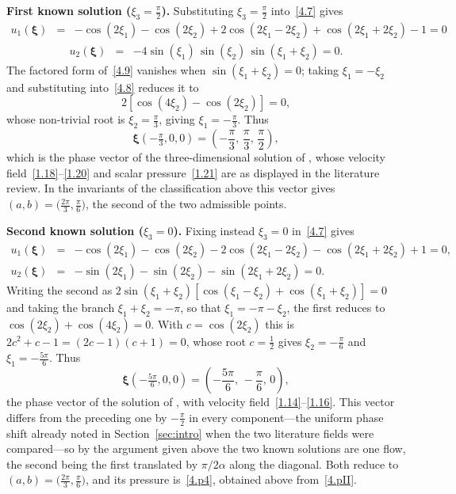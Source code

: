 \documentclass[11pt]{jfm}
\numberwithin{equation}{section}
\begin{document}
\medskip
\noindent\textbf{First known solution ($\xi_3=\tfrac{\pi}{2}$).} Substituting $\xi_3=\tfrac{\pi}{2}$
into~\eqref{4.7} gives
\begin{eqnarray}
\label{4.8}
u_1(\boldsymbol{\xi}) &=& -\cos(2\xi_1) - \cos(2\xi_2) + 2\cos(2\xi_1 - 2\xi_2) + \cos(2\xi_1 + 2\xi_2) - 1 = 0
\end{eqnarray}
\begin{eqnarray}
\label{4.9}
u_2(\boldsymbol{\xi}) &=& -4\sin(\xi_1)\,\sin(\xi_2)\,\sin(\xi_1 + \xi_2) = 0 .
\end{eqnarray}
The factored form of~\eqref{4.9} vanishes when $\sin(\xi_1+\xi_2)=0$; taking $\xi_1 = -\xi_2$
and substituting into~\eqref{4.8} reduces it to
\[
2\left[\cos(4\xi_2) - \cos(2\xi_2)\right] = 0 ,
\]
whose non-trivial root is $\xi_2 = \tfrac{\pi}{3}$, giving $\xi_1 = -\tfrac{\pi}{3}$. Thus
\[
\boldsymbol{\xi}\!\left(-\tfrac{\pi}{3},0,0\right)
=\left(-\frac{\pi}{3},\,\frac{\pi}{3},\,\frac{\pi}{2}\right),
\]
which is the phase vector of the three-dimensional solution of \cite{tha4}, whose velocity
field~\eqref{1.18}--\eqref{1.20} and scalar pressure~\eqref{1.21} are as displayed in the
literature review. In the invariants of the classification above this vector gives
$(a,b)=\bigl(\tfrac{2\pi}{3},\tfrac{\pi}{6}\bigr)$, the second of the two admissible points.

\medskip
\noindent\textbf{Second known solution ($\xi_3=0$).} Fixing instead $\xi_3 = 0$ in~\eqref{4.7} gives
\begin{eqnarray}
\label{4.10}
u_1(\boldsymbol{\xi}) &=& -\cos(2\xi_1) - \cos(2\xi_2) - 2\cos(2\xi_1 - 2\xi_2) - \cos(2\xi_1 + 2\xi_2) + 1 = 0, \nonumber\\
u_2(\boldsymbol{\xi}) &=& -\sin(2\xi_1) - \sin(2\xi_2) - \sin(2\xi_1 + 2\xi_2) = 0 .
\end{eqnarray}
Writing the second as $2\sin(\xi_1+\xi_2)\left[\cos(\xi_1-\xi_2)+\cos(\xi_1+\xi_2)\right]=0$
and taking the branch $\xi_1+\xi_2=-\pi$, so that $\xi_1 = -\pi-\xi_2$, the first reduces to
$\cos(2\xi_2)+\cos(4\xi_2)=0$. With $c=\cos(2\xi_2)$ this is $2c^2+c-1=(2c-1)(c+1)=0$, whose
root $c=\tfrac{1}{2}$ gives $\xi_2 = -\tfrac{\pi}{6}$ and $\xi_1 = -\tfrac{5\pi}{6}$. Thus
\[
\boldsymbol{\xi}\!\left(-\tfrac{5\pi}{6},0,0\right)
=\left(-\frac{5\pi}{6},\,-\frac{\pi}{6},\,0\right),
\]
the phase vector of the solution of \cite{ant}, with velocity field~\eqref{1.14}--\eqref{1.16}.
This vector differs from the preceding one by $-\tfrac{\pi}{2}$ in every component---the uniform
phase shift already noted in Section~\ref{sec:intro} when the two literature fields were
compared---so by the argument given above the two known solutions are one flow, the second being
the first translated by $\pi/2\alpha$ along the diagonal. Both reduce to
$(a,b)=\bigl(\tfrac{2\pi}{3},\tfrac{\pi}{6}\bigr)$, and its pressure is~\eqref{4.p4}, obtained
above from~\eqref{4.pII}.
\end{document}
